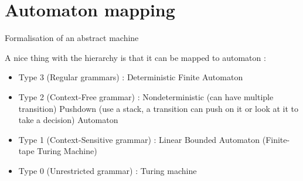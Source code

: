 \section{Automaton mapping}
    \theoremstyle{definition}
    \begin{definition}[Automaton]
        Formalisation of an abstract machine
    \end{definition}
    A nice thing with the hierarchy is that it can be mapped to automaton : 
    \begin{itemize}
        \item Type 3 (Regular grammars) : Deterministic Finite Automaton
        \item Type 2 (Context-Free grammar) : Nondeterministic (can have
        multiple transition) Pushdown (use a stack, a transition can push on it
        or look at it to take a decision) Automaton
        \item Type 1 (Context-Sensitive grammar) : Linear Bounded Automaton
        (Finite-tape Turing Machine)
        \item Type 0 (Unrestricted grammar) : Turing machine
    \end{itemize}